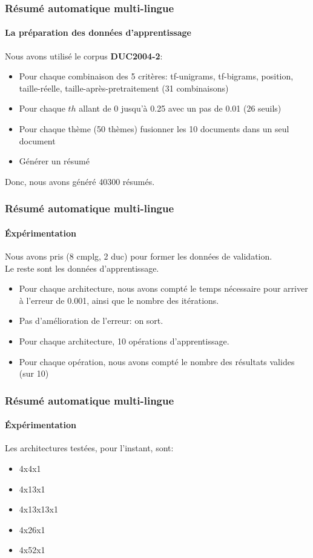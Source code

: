 \documentclass{beamer}
\begin{document}
\begin{frame}
\frametitle{Résumé automatique multi-lingue}
\framesubtitle{La préparation des données d'apprentissage}
{\small 
Nous avons utilisé le corpus \textbf{DUC2004-2}:
\begin{itemize}
\item Pour chaque combinaison des 5 critères: tf-unigrams, tf-bigrams, position, taille-réelle, taille-après-pretraitement (31 combinaisons)
\item Pour chaque $ th $ allant de 0 jusqu'à 0.25 avec un pas de 0.01 (26 seuils)
\item Pour chaque thème (50 thèmes) fusionner les 10 documents dans un seul document
\item Générer un résumé
\end{itemize}
Donc, nous avons généré 40300 résumés. }
\end{frame}

\begin{frame}
\frametitle{Résumé automatique multi-lingue}
\framesubtitle{\'Expérimentation}

Nous avons pris (8 cmplg, 2 duc) pour former les données de validation. \\
Le reste sont les données d'apprentissage.
\begin{itemize}
\item Pour chaque architecture, nous avons compté le temps nécessaire pour arriver à l'erreur de 0.001, ainsi que le nombre des itérations.
\item Pas d'amélioration de l'erreur: on sort.
\item Pour chaque architecture, 10 opérations d'apprentissage.
\item Pour chaque opération, nous avons compté le nombre des résultats valides (sur 10)
\end{itemize}
\end{frame}

\begin{frame}
\frametitle{Résumé automatique multi-lingue}
\framesubtitle{\'Expérimentation}
Les architectures testées, pour l’instant, sont:
\begin{itemize}
\item 4x4x1
\item 4x13x1
\item 4x13x13x1
\item 4x26x1
\item 4x52x1
\end{itemize}

\end{frame}
\end{document}
